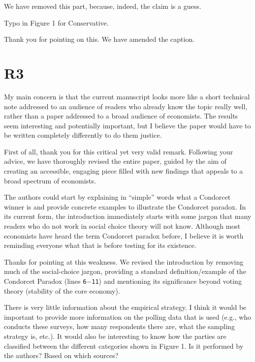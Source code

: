 \documentclass[a4paper, 12pt]{scrartcl}
\theoremstyle{break}
\newenvironment{changes}{\par\color{violet}\par\addvspace{\baselineskip}}{\par\addvspace{\baselineskip}}
\begin{document}
We have removed this part, because, indeed, the claim is a guess.

\begin{changes}
Typo in Figure 1 for Conservative.
\end{changes}
Thank you for pointing on this. We have amended the caption. 

\newpage
\section{R3}
\begin{changes}
My main concern is that the current manuscript looks more like a short technical note addressed to an audience of readers who already know the topic really well, rather than a paper addressed to a broad audience of economists. The results seem interesting and potentially important, but I believe the paper would have to be written completely differently to do them justice.
\end{changes}

First of all, thank you for this critical yet very valid remark. Following your advice, we have thoroughly revised the entire paper, guided by the aim of creating an accessible, engaging piece filled with new findings that appeals to a broad spectrum of economists.

\begin{changes}
The authors could start by explaining in “simple” words what a Condorcet winner is and provide concrete examples to illustrate the Condorcet paradox. In its current form, the introduction immediately starts with some jargon that many readers who do not work in social choice theory will not know. Although most economists have heard the term Condorcet paradox before, I believe it is worth reminding everyone what that is before testing for its existence.
\end{changes}

Thanks for pointing at this weakness. We revised the introduction by removing much of the social-choice jargon, providing a standard definition/example of the Condorcet Paradox (lines \texttt{6$-$11}) and mentioning its significance beyond voting theory (stability of the core economy). 

\begin{changes}
There is very little information about the empirical strategy. I think it would be important to provide more information on the polling data that is used (e.g., who conducts these surveys, how many respondents there are, what the sampling strategy is, etc.). It would also be interesting to know how the parties are classified between the different categories shown in Figure 1. Is it performed by the authors? Based on which sources?
\end{changes}
\end{document}
